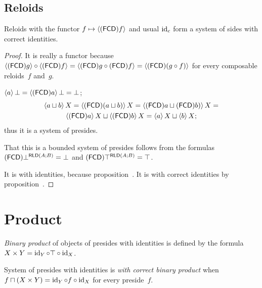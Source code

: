 \subsection{Reloids}

\begin{prop}
Reloids with the functor $f\mapsto\left\langle (\mathsf{FCD}) f\right\rangle$ and usual $\operatorname{id}_c$ form a system of sides with correct identities.
\end{prop}

\begin{proof}
It is really a functor because
$\left\langle (\mathsf{FCD}) g\right\rangle\circ\left\langle (\mathsf{FCD}) f\right\rangle = \left\langle (\mathsf{FCD}) g\circ(\mathsf{FCD}) f\right\rangle = \left\langle (\mathsf{FCD})(g\circ f)\right\rangle$
for every composable reloids~$f$ and~$g$.

$\left\langle a\right\rangle\bot = \left\langle (\mathsf{FCD}) a\right\rangle\bot = \bot$;
\begin{multline*}
\left\langle a\sqcup b\right\rangle X = \left\langle (\mathsf{FCD})(a\sqcup b)\right\rangle X = \left\langle (\mathsf{FCD}) a\sqcup(\mathsf{FCD}) b)\right\rangle X = \\
\left\langle (\mathsf{FCD}) a\right\rangle X\sqcup\left\langle (\mathsf{FCD}) b\right\rangle X = \left\langle a\right\rangle X\sqcup\left\langle b\right\rangle X;
\end{multline*}
thus it is a system of presides.

That this is a bounded system of presides follows from the formulas
$(\mathsf{FCD})\bot^{\mathsf{RLD}(A;B)}=\bot$ and $(\mathsf{FCD})\top^{\mathsf{RLD}(A;B)}=\top$.

It is with identities, because proposition~.
It is with correct identities by proposition~.
\end{proof}



\section{Product}

\begin{defn}
\emph{Binary product} of objects of presides with identities is defined by the formula $X\times Y=\operatorname{id}_Y\circ\top\circ\operatorname{id}_X$.

\end{defn}

\begin{defn}
System of presides with identities is \emph{with correct binary product} when $f\sqcap(X\times Y) = \operatorname{id}_Y\circ f\circ\operatorname{id}_X$
for every preside~$f$.
\end{defn}

